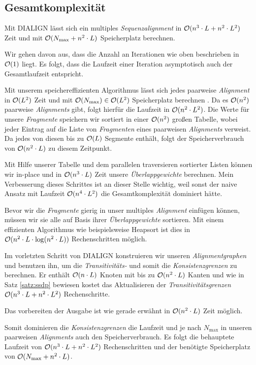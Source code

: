 \subsection{Gesamtkomplexität}

\begin{korollar}
	Mit DIALIGN	lässt sich ein multiples \emph{Sequenzalignment} in $\mathcal{O}(n^3\cdot L + n^2\cdot L^2)$ Zeit und mit $\mathcal{O}(N_{\max} + n^2\cdot L)$ Speicherplatz berechnen.
\end{korollar}

\begin{beweis}
	Wir gehen davon aus, dass die Anzahl an Iterationen wie oben beschrieben in $\mathcal{O}(1)$ liegt. Es folgt, dass die Laufzeit einer Iteration asymptotisch auch der Gesamtlaufzeit entspricht. 
	
	Mit unserem speichereffizienten Algorithmus lässt sich jedes paarweise \emph{Alignment} in $\mathcal{O}(L^2)$ Zeit und mit $\mathcal{O}(N_{\max}) \in \mathcal{O}(L^2)$ Speicherplatz berechnen \citep{m02}. Da es $\mathcal{O}(n^2)$ paarweise \emph{Alignments} gibt, folgt hierfür die Laufzeit in $\mathcal{O}(n^2\cdot L^2)$. Die Werte für unsere \emph{Fragmente} speichern wir sortiert in einer $\mathcal{O}(n^2)$ großen Tabelle, wobei jeder Eintrag auf die Liste von \emph{Fragmenten} eines paarweisen \emph{Alignments} verweist. Da jedes von diesen bis zu $\mathcal{O}(L)$ Segmente enthält, folgt der Speicherverbrauch von $\mathcal{O}(n^2\cdot L)$ zu diesem Zeitpunkt.
	
	Mit Hilfe unserer Tabelle und dem parallelen traversieren sortierter Listen können wir in-place und in $\mathcal{O}(n^3\cdot L)$ Zeit unsere \emph{Überlappgewichte} berechnen. Mein Verbesserung dieses Schrittes ist an dieser Stelle wichtig, weil sonst der naive Ansatz mit Laufzeit $\mathcal{O}(n^4\cdot L^2)$ die Gesamtkomplexität dominiert hätte.
	
	Bevor wir die \emph{Fragmente} gierig in unser multiples \emph{Alignment} einfügen können, müssen wir sie alle auf Basis ihrer \emph{Überlappgewichte} sortieren. Mit einem effizienten Algorithmus wie beispielsweise Heapsort ist dies in $\mathcal{O}(n^2\cdot L\cdot \log(n^2\cdot L))$ Rechenschritten möglich. 
	
	Im vorletzten Schritt von DIALIGN konstruieren wir unseren \emph{Alignmentgraphen} und benutzen ihn, um die \emph{Transitivitäts-} und somit die \emph{Konsistenzgrenzen} zu berechnen. Er enthält $\mathcal{O}(n\cdot L)$ Knoten mit bis zu $\mathcal{O}(n^2\cdot L)$ Kanten und wie in Satz \ref{satz:ssdp} bewiesen kostet das Aktualisieren der \emph{Transitivitätsgrenzen} $\mathcal{O}(n^3\cdot L + n^2\cdot L^2)$ Rechenschritte. 
	
	Das vorbereiten der Ausgabe ist wie gerade erwähnt in $\mathcal{O}(n^2\cdot L)$ Zeit möglich.
	
	Somit dominieren die \emph{Konsistenzgrenzen} die Laufzeit und je nach $N_{\max}$ in unseren paarweisen \emph{Alignments} auch den Speicherverbrauch. Es folgt die behauptete Laufzeit von $\mathcal{O}(n^3\cdot L + n^2\cdot L^2)$ Rechenschritten und der benötigte Speicherplatz von $\mathcal{O}(N_{\max} + n^2\cdot L)$. 
\end{beweis}

